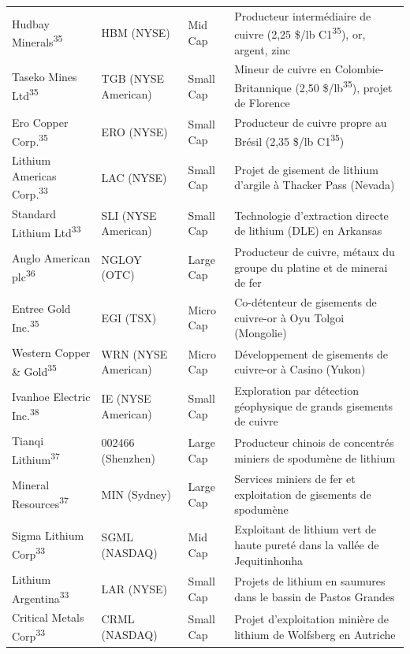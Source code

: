 \documentclass[11pt,a4paper]{article}
\begin{document}
\begin{longtable}{p{3cm} p{3.5cm} p{3cm} p{5cm}}
Hudbay Minerals\textsuperscript{35} & HBM (NYSE) & Mid Cap & Producteur intermédiaire de cuivre (2,25 \$/lb C1\textsuperscript{35}), or, argent, zinc \\
Taseko Mines Ltd\textsuperscript{35} & TGB (NYSE American) & Small Cap & Mineur de cuivre en Colombie-Britannique (2,50 \$/lb\textsuperscript{35}), projet de Florence \\
Ero Copper Corp.\textsuperscript{35} & ERO (NYSE) & Small Cap & Producteur de cuivre propre au Brésil (2,35 \$/lb C1\textsuperscript{35}) \\
Lithium Americas Corp.\textsuperscript{33} & LAC (NYSE) & Small Cap & Projet de gisement de lithium d'argile à Thacker Pass (Nevada) \\
Standard Lithium Ltd\textsuperscript{33} & SLI (NYSE American) & Small Cap & Technologie d'extraction directe de lithium (DLE) en Arkansas \\
Anglo American plc\textsuperscript{36} & NGLOY (OTC) & Large Cap & Producteur de cuivre, métaux du groupe du platine et de minerai de fer \\
Entree Gold Inc.\textsuperscript{35} & EGI (TSX) & Micro Cap & Co-détenteur de gisements de cuivre-or à Oyu Tolgoi (Mongolie) \\
Western Copper \& Gold\textsuperscript{35} & WRN (NYSE American) & Micro Cap & Développement de gisements de cuivre-or à Casino (Yukon) \\
Ivanhoe Electric Inc.\textsuperscript{38} & IE (NYSE American) & Small Cap & Exploration par détection géophysique de grands gisements de cuivre \\
Tianqi Lithium\textsuperscript{37} & 002466 (Shenzhen) & Large Cap & Producteur chinois de concentrés miniers de spodumène de lithium \\
Mineral Resources\textsuperscript{37} & MIN (Sydney) & Large Cap & Services miniers de fer et exploitation de gisements de spodumène \\
Sigma Lithium Corp\textsuperscript{33} & SGML (NASDAQ) & Mid Cap & Exploitant de lithium vert de haute pureté dans la vallée de Jequitinhonha \\
Lithium Argentina\textsuperscript{33} & LAR (NYSE) & Small Cap & Projets de lithium en saumures dans le bassin de Pastos Grandes \\
Critical Metals Corp\textsuperscript{33} & CRML (NASDAQ) & Small Cap & Projet d'exploitation minière de lithium de Wolfsberg en Autriche \\
\bottomrule
\end{longtable}
\end{document}
